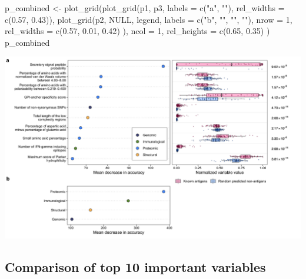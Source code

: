 \documentclass[
  11pt,
  oneside]{book}
\newenvironment{Shaded}{\begin{snugshade}}{\end{snugshade}}
\newcommand{\AttributeTok}[1]{\textcolor[rgb]{0.77,0.63,0.00}{#1}}
\newcommand{\ConstantTok}[1]{\textcolor[rgb]{0.00,0.00,0.00}{#1}}
\newcommand{\DecValTok}[1]{\textcolor[rgb]{0.00,0.00,0.81}{#1}}
\newcommand{\FloatTok}[1]{\textcolor[rgb]{0.00,0.00,0.81}{#1}}
\newcommand{\FunctionTok}[1]{\textcolor[rgb]{0.00,0.00,0.00}{#1}}
\newcommand{\NormalTok}[1]{#1}
\newcommand{\OtherTok}[1]{\textcolor[rgb]{0.56,0.35,0.01}{#1}}
\newcommand{\StringTok}[1]{\textcolor[rgb]{0.31,0.60,0.02}{#1}}
\begin{document}
\begin{Shaded}
\begin{Highlighting}[]
\NormalTok{p\_combined }\OtherTok{\textless{}{-}} \FunctionTok{plot\_grid}\NormalTok{(}\FunctionTok{plot\_grid}\NormalTok{(p1, p3, }\AttributeTok{labels =} \FunctionTok{c}\NormalTok{(}\StringTok{"a"}\NormalTok{, }\StringTok{""}\NormalTok{), }\AttributeTok{rel\_widths =} \FunctionTok{c}\NormalTok{(}\FloatTok{0.57}\NormalTok{, }\FloatTok{0.43}\NormalTok{)),}
  \FunctionTok{plot\_grid}\NormalTok{(p2, }\ConstantTok{NULL}\NormalTok{, legend,}
    \AttributeTok{labels =} \FunctionTok{c}\NormalTok{(}\StringTok{"b"}\NormalTok{, }\StringTok{""}\NormalTok{, }\StringTok{""}\NormalTok{, }\StringTok{""}\NormalTok{),}
    \AttributeTok{nrow =} \DecValTok{1}\NormalTok{, }\AttributeTok{rel\_widths =} \FunctionTok{c}\NormalTok{(}\FloatTok{0.57}\NormalTok{, }\FloatTok{0.01}\NormalTok{, }\FloatTok{0.42}\NormalTok{)}
\NormalTok{  ),}
  \AttributeTok{ncol =} \DecValTok{1}\NormalTok{, }\AttributeTok{rel\_heights =} \FunctionTok{c}\NormalTok{(}\FloatTok{0.65}\NormalTok{, }\FloatTok{0.35}\NormalTok{)}
\NormalTok{)}
\NormalTok{p\_combined}
\end{Highlighting}
\end{Shaded}

\begin{center}\includegraphics[width=1\linewidth]{./figures/Fig 4} \end{center}

\hypertarget{comparison-of-top-10-important-variables}{%
\subsection{Comparison of top 10 important variables}\label{comparison-of-top-10-important-variables}}
\end{document}
